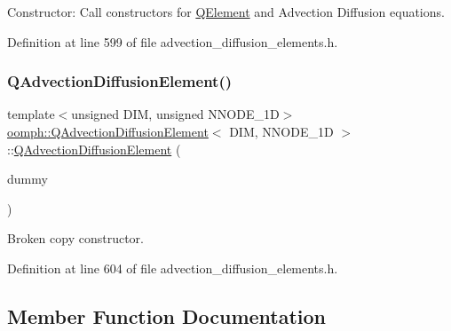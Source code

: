 Constructor\+: Call constructors for \hyperlink{classoomph_1_1QElement}{Q\+Element} and Advection Diffusion equations. 



Definition at line 599 of file advection\+\_\+diffusion\+\_\+elements.\+h.

\mbox{\label{classoomph_1_1QAdvectionDiffusionElement_a666a536d74e1fdb9bd48f70b2f708e20}} 
\subsubsection{\texorpdfstring{Q\+Advection\+Diffusion\+Element()}{QAdvectionDiffusionElement()}\hspace{0.1cm}{\footnotesize\ttfamily [2/2]}}
{\footnotesize\ttfamily template$<$unsigned D\+IM, unsigned N\+N\+O\+D\+E\+\_\+1D$>$ \\
\hyperlink{classoomph_1_1QAdvectionDiffusionElement}{oomph\+::\+Q\+Advection\+Diffusion\+Element}$<$ D\+IM, N\+N\+O\+D\+E\+\_\+1D $>$\+::\hyperlink{classoomph_1_1QAdvectionDiffusionElement}{Q\+Advection\+Diffusion\+Element} (\begin{DoxyParamCaption}\item[{const \hyperlink{classoomph_1_1QAdvectionDiffusionElement}{Q\+Advection\+Diffusion\+Element}$<$ D\+IM, N\+N\+O\+D\+E\+\_\+1D $>$ \&}]{dummy }\end{DoxyParamCaption})\hspace{0.3cm}{\ttfamily [inline]}}



Broken copy constructor. 



Definition at line 604 of file advection\+\_\+diffusion\+\_\+elements.\+h.



\subsection{Member Function Documentation}
\mbox{\label{classoomph_1_1QAdvectionDiffusionElement_a968920ec8057c9b5a49154c5845c7dbd}} 
